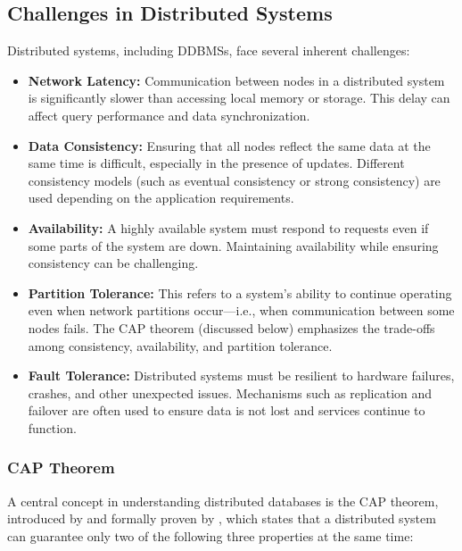 \subsection{Challenges in Distributed Systems}
Distributed systems, including DDBMSs, face several inherent challenges:
\begin{itemize}
	\item \textbf{Network Latency:} Communication between nodes in a distributed system is significantly slower than accessing local memory or storage.
	      This delay can affect query performance and data synchronization.

	\item \textbf{Data Consistency:} Ensuring that all nodes reflect the same data at the same time is difficult, especially in the presence of updates.
	      Different consistency models (such as eventual consistency or strong consistency) are used depending on the application requirements.

	\item \textbf{Availability:} A highly available system must respond to requests even if some parts of the system are down.
	      Maintaining availability while ensuring consistency can be challenging.

	\item \textbf{Partition Tolerance:} This refers to a system's ability to continue operating even when network partitions occur—i.e., when communication between some nodes fails.
	      The CAP theorem (discussed below) emphasizes the trade-offs among consistency, availability, and partition tolerance.

	\item \textbf{Fault Tolerance:} Distributed systems must be resilient to hardware failures, crashes, and other unexpected issues.
	      Mechanisms such as replication and failover are often used to ensure data is not lost and services continue to function.
\end{itemize}

\subsubsection{CAP Theorem}
A central concept in understanding distributed databases is the CAP theorem, introduced by \parencite{brewerRobustDistributedSystems2000} and formally proven by \parencite{gilbertBrewersConjectureFeasibility2002}, which states that a distributed system can guarantee only two of the following three properties at the same time:

